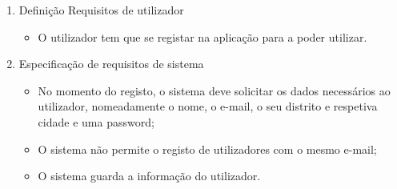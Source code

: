 \begin{enumerate}
    \item Definição Requisitos de utilizador
    \begin{itemize}
        \item O utilizador tem que se registar na aplicação para a poder utilizar.
    \end{itemize}
    \item Especificação de requisitos de sistema
    \begin{itemize}
        \item No momento do registo, o sistema deve solicitar os dados necessários ao utilizador, nomeadamente o nome, o e-mail, o seu distrito e respetiva cidade e uma password;
        \item O sistema não permite o registo de utilizadores com o mesmo e-mail;
        \item O sistema guarda a informação do utilizador.
    \end{itemize}
\end{enumerate}